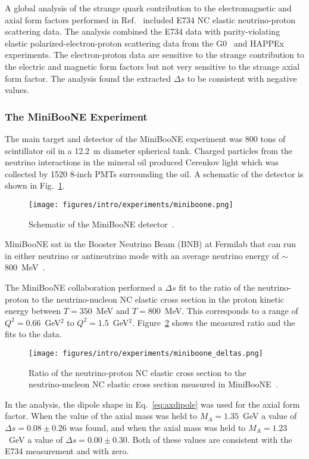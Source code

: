   A global analysis of the strange quark contribution to the electromagnetic
  and axial form factors performed in Ref.~\cite{Pate:2008va} included E734 NC
  elastic neutrino-proton scattering data. The analysis combined the E734 data
  with parity-violating elastic polarized-electron-proton scattering data from
  the G0~\cite{Armstrong:2005hs} and HAPPEx~\cite{Aniol:2004hp} experiments.
  The electron-proton data are sensitive to the strange contribution to the
  electric and magnetic form factors but not very sensitive to the strange
  axial form factor. The analysis found the extracted $\Delta s$ to be
  consistent with negative values.

  \subsubsection{The MiniBooNE Experiment}\label{sec:miniboonence}
  The main target and detector of the MiniBooNE experiment was 800 tons of
  scintillator oil in a 12.2~m diameter spherical tank. Charged particles
  from the neutrino interactions in the mineral oil produced Cerenkov light
  which was collected by 1520 8-inch PMTs surrounding the oil. A schematic of
  the detector is shown in Fig.~\ref{fig:miniboonedetector}.
  \begin{figure}[h]
    \centering
    \texttt{[image: figures/intro/experiments/miniboone.png]}
    \caption{Schematic of the MiniBooNE detector~\cite{Cheng:2012yy}.}
    \label{fig:miniboonedetector}
  \end{figure}
  MiniBooNE sat in the Booster Neutrino Beam (BNB) at Fermilab that can run
  in either neutrino or antineutrino mode with an average neutrino energy of
  $\sim$800~MeV~\cite{Aguilar-Arevalo:2008yp}.

  The MiniBooNE collaboration performed a $\Delta s$ fit to the ratio of the
  neutrino-proton to the neutrino-nucleon NC elastic cross section in the
  proton kinetic energy between $T = 350$~MeV and $T = 800$~MeV. This
  corresponds to a range of $Q^2 = 0.66$~GeV$^2$ to $Q^2 = 1.5$~GeV$^2$.
  Figure~\ref{fig:miniboonedeltas} shows the measured ratio and the fits to the
  data.
  \begin{figure}[h]
    \centering
    \texttt{[image: figures/intro/experiments/miniboone\_deltas.png]}
    \caption{Ratio of the neutrino-proton NC elastic cross section to the
    neutrino-nucleon NC elastic cross section measured in
    MiniBooNE~\cite{Aguilar-Arevalo:2010cx}.}
    \label{fig:miniboonedeltas}
  \end{figure}
  In the analysis, the dipole shape in Eq.~\ref{eq:axdipole} was used for the
  axial form factor. When the value of the axial mass was held to $M_A =
  1.35$~GeV a value of $\Delta s = 0.08 \pm 0.26$ was found, and when the axial
  mass was held to $M_A = 1.23$~GeV a value of $\Delta s = 0.00 \pm 0.30$. Both
  of these values are consistent with the E734 measurement and with zero.

